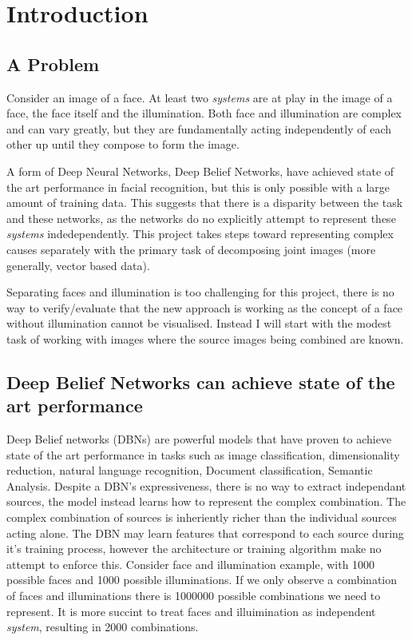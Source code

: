 \chapter{Introduction}


\section{A Problem}
Consider an image of a face. At least two \emph{systems} are at play in the image of a face, the face itself and the illumination. Both face and illumination are complex and can vary greatly, but they are fundamentally acting independently of each other up until they compose to form the image.

A form of Deep Neural Networks, Deep Belief Networks, have achieved state of the art performance in facial recognition, but this is only possible with a large amount of training data. This suggests that there is a disparity between the task and these networks, as the networks do no explicitly attempt to represent these \emph{systems} indedependently. This project takes steps toward representing complex causes separately with the primary task of decomposing joint images (more generally, vector based data).

Separating faces and illumination is too challenging for this project, there is no way to verify/evaluate that the new approach is working as the concept of a face without illumination cannot be visualised. Instead I will start with the modest task of working with images where the source images being combined are known.

\section{Deep Belief Networks can achieve state of the art performance}
Deep Belief networks (DBNs) are powerful models that have proven to achieve state of the art performance in tasks such as image classification, dimensionality reduction, natural language recognition, Document classification, Semantic Analysis.\todocite{}
Despite a DBN's expressiveness, there is no way to extract independant sources, the model instead learns how to represent the complex combination. The complex combination of sources is inheriently richer than the individual sources acting alone. The DBN may learn features that correspond to each source during it's training process, however the architecture or training algorithm make no attempt to enforce this. Consider face and illumination example, with 1000 possible faces and 1000 possible illuminations. If we only observe a combination of faces and illuminations there is 1000000 possible combinations we need to represent. It is more succint to treat faces and illuimination as independent \emph{system}, resulting in 2000 combinations.

